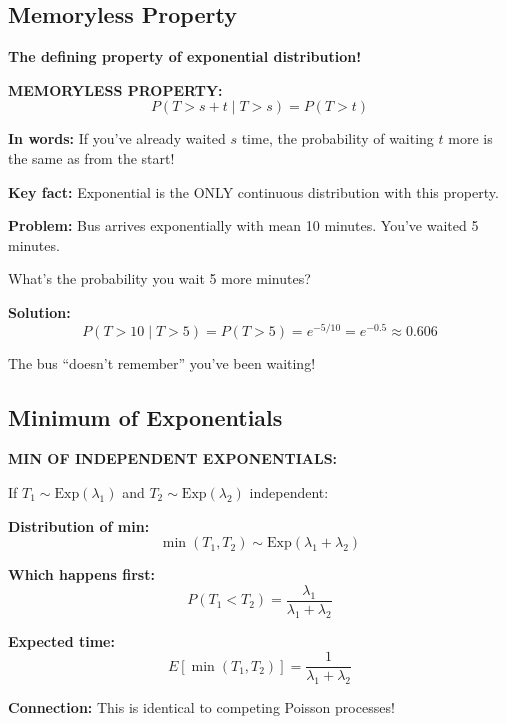 \documentclass[10pt,letterpaper]{article}
\begin{document}
\subsection{Memoryless Property}

\begin{criticalbox}
\textbf{The defining property of exponential distribution!}
\end{criticalbox}

\begin{formulabox}[colback=yellow!20,colframe=orange!80]
\textbf{MEMORYLESS PROPERTY:}
\[
\boxed{P(T > s + t \mid T > s) = P(T > t)}
\]

\textbf{In words:} If you've already waited $s$ time, the probability of waiting $t$ more is the same as from the start!

\textbf{Key fact:} Exponential is the ONLY continuous distribution with this property.
\end{formulabox}

\begin{examplebox}
\textbf{Problem:} Bus arrives exponentially with mean 10 minutes. You've waited 5 minutes.

What's the probability you wait 5 more minutes?

\textbf{Solution:}
\[
P(T > 10 \mid T > 5) = P(T > 5) = e^{-5/10} = e^{-0.5} \approx \boxed{0.606}
\]

The bus ``doesn't remember'' you've been waiting!
\end{examplebox}

\subsection{Minimum of Exponentials}

\begin{formulabox}
\textbf{MIN OF INDEPENDENT EXPONENTIALS:}

If $T_1 \sim \text{Exp}(\lambda_1)$ and $T_2 \sim \text{Exp}(\lambda_2)$ independent:

\vspace{0.2cm}

\textbf{Distribution of min:}
\[
\min(T_1, T_2) \sim \text{Exp}(\lambda_1 + \lambda_2)
\]

\textbf{Which happens first:}
\[
P(T_1 < T_2) = \frac{\lambda_1}{\lambda_1 + \lambda_2}
\]

\textbf{Expected time:}
\[
E[\min(T_1, T_2)] = \frac{1}{\lambda_1 + \lambda_2}
\]

\textbf{Connection:} This is identical to competing Poisson processes!
\end{formulabox}
\end{document}
